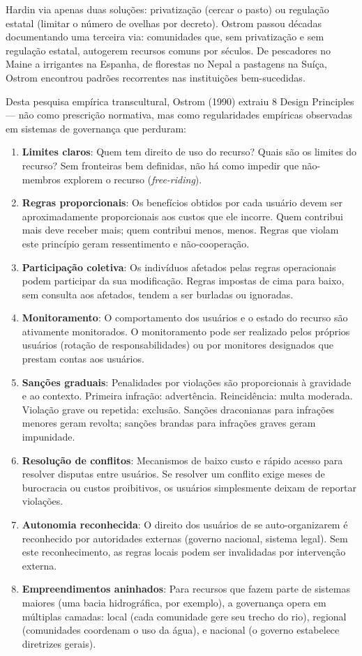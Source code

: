 Hardin via apenas duas soluções: privatização (cercar o pasto) ou regulação estatal (limitar o número de ovelhas por decreto). Ostrom passou décadas documentando uma terceira via: comunidades que, sem privatização e sem regulação estatal, autogerem recursos comuns por séculos. De pescadores no Maine a irrigantes na Espanha, de florestas no Nepal a pastagens na Suíça, Ostrom encontrou padrões recorrentes nas instituições bem-sucedidas.

Desta pesquisa empírica transcultural, Ostrom (1990)  extraiu 8 Design Principles — não como prescrição normativa, mas como regularidades empíricas observadas em sistemas de governança que perduram:

\begin{enumerate}[label=DP\arabic*:]
    \item \textbf{Limites claros}: Quem tem direito de uso do recurso? Quais são os limites do recurso? Sem fronteiras bem definidas, não há como impedir que não-membros explorem o recurso (\textit{free-riding}).
    \item \textbf{Regras proporcionais}: Os benefícios obtidos por cada usuário devem ser aproximadamente proporcionais aos custos que ele incorre. Quem contribui mais deve receber mais; quem contribui menos, menos. Regras que violam este princípio geram ressentimento e não-cooperação.
    \item \textbf{Participação coletiva}: Os indivíduos afetados pelas regras operacionais podem participar da sua modificação. Regras impostas de cima para baixo, sem consulta aos afetados, tendem a ser burladas ou ignoradas.
    \item \textbf{Monitoramento}: O comportamento dos usuários e o estado do recurso são ativamente monitorados. O monitoramento pode ser realizado pelos próprios usuários (rotação de responsabilidades) ou por monitores designados que prestam contas aos usuários.
    \item \textbf{Sanções graduais}: Penalidades por violações são proporcionais à gravidade e ao contexto. Primeira infração: advertência. Reincidência: multa moderada. Violação grave ou repetida: exclusão. Sanções draconianas para infrações menores geram revolta; sanções brandas para infrações graves geram impunidade.
    \item \textbf{Resolução de conflitos}: Mecanismos de baixo custo e rápido acesso para resolver disputas entre usuários. Se resolver um conflito exige meses de burocracia ou custos proibitivos, os usuários simplesmente deixam de reportar violações.
    \item \textbf{Autonomia reconhecida}: O direito dos usuários de se auto-organizarem é reconhecido por autoridades externas (governo nacional, sistema legal). Sem este reconhecimento, as regras locais podem ser invalidadas por intervenção externa.
    \item \textbf{Empreendimentos aninhados}: Para recursos que fazem parte de sistemas maiores (uma bacia hidrográfica, por exemplo), a governança opera em múltiplas camadas: local (cada comunidade gere seu trecho do rio), regional (comunidades coordenam o uso da água), e nacional (o governo estabelece diretrizes gerais).
\end{enumerate}

